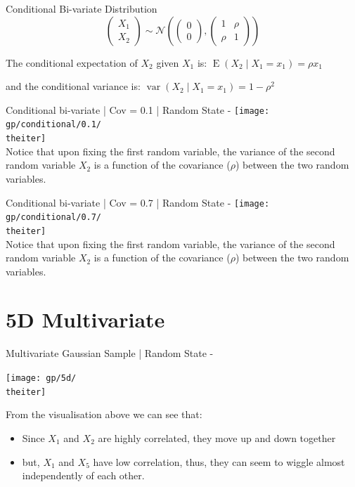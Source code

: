 \documentclass{beamer}
\begin{document}
	\begin{frame}{Conditional Bi-variate Distribution}
		$$
		\begin{pmatrix}
		X_1 \\
		X_2
		\end{pmatrix}  \sim \mathcal{N} \left( \begin{pmatrix}
		0 \\
		0
		\end{pmatrix} , \begin{pmatrix}
		1 & \rho \\
		\rho & 1
		\end{pmatrix} \right)
		$$
		
		The conditional expectation of $X_2$ given $X_1$ is: $\operatorname{E}(X_2 \mid X_1=x_1)= \rho x_1$
		
		and the conditional variance is: $\operatorname{var}(X_2 \mid X_1 = x_1) = 1-\rho^2$
	\end{frame}
	
	{%
		\begin{frame}{Conditional bi-variate | Cov = 0.1 | Random State - \theiter}
			\texttt{[image: gp/conditional/0.1/\\theiter]}\\
			Notice that upon fixing the first random variable, the variance of the second random variable $X_2$ is a function of the covariance ($\rho$) between the two random variables.
		\end{frame}
	}
	
	{%
		\begin{frame}{Conditional bi-variate | Cov = 0.7 | Random State - \theiter}
			\texttt{[image: gp/conditional/0.7/\\theiter]}\\
			Notice that upon fixing the first random variable, the variance of the second random variable $X_2$ is a function of the covariance ($\rho$) between the two random variables.
		\end{frame}
	}
	
	\section{5D Multivariate}
	
	{%
		\begin{frame}{Multivariate Gaussian Sample | Random State - \theiter}
			\begin{center}
				\texttt{[image: gp/5d/\\theiter]}
			\end{center}
			From the visualisation above we can see that:
			\begin{itemize}
				\item Since $X_1$ and $X_2$ are highly correlated, they move up and down together
				\item but, $X_1$ and $X_5$ have low correlation, thus, they can seem to wiggle almost independently of each other.
			\end{itemize}
		\end{frame}
	}
	
\end{document}
